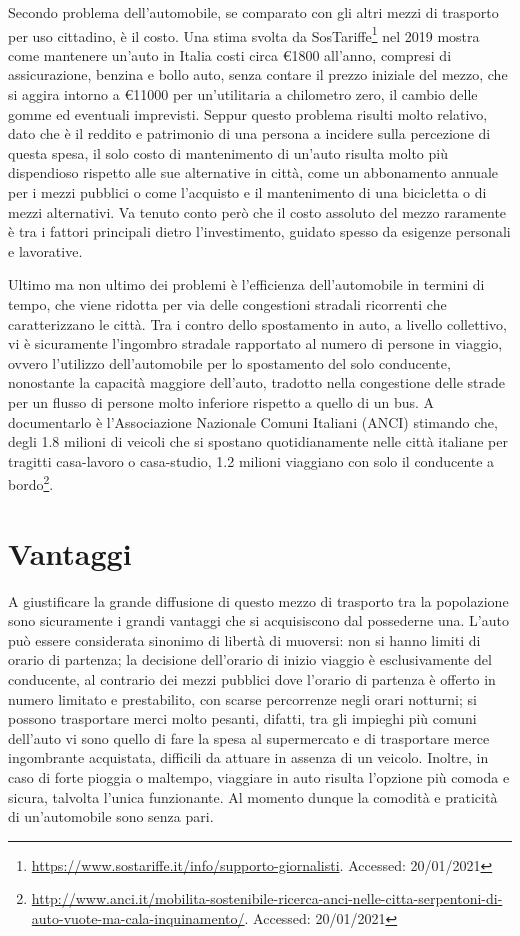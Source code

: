 Secondo problema dell'automobile, se comparato con gli altri mezzi di trasporto per uso cittadino, è il costo. Una stima svolta da SosTariffe\footnote{\url{https://www.sostariffe.it/info/supporto-giornalisti}. Accessed: 20/01/2021} nel 2019 mostra come mantenere un'auto in Italia costi circa €1800 all'anno, compresi di assicurazione, benzina e bollo auto, senza contare il prezzo iniziale del mezzo, che si aggira intorno a €11000 per un'utilitaria a chilometro zero, il cambio delle gomme ed eventuali imprevisti. Seppur questo problema risulti molto relativo, dato che è il reddito e patrimonio di una persona a incidere sulla percezione di questa spesa, il solo costo di mantenimento di un'auto risulta molto più dispendioso rispetto alle sue alternative in città, come un abbonamento annuale per i mezzi pubblici o come l'acquisto e il mantenimento di una bicicletta o di mezzi alternativi. Va tenuto conto però che il costo assoluto del mezzo raramente è tra i fattori principali dietro l'investimento, guidato spesso da esigenze personali e lavorative.

Ultimo ma non ultimo dei problemi è l'efficienza dell'automobile in termini di tempo, che viene ridotta per via delle congestioni stradali ricorrenti che caratterizzano le città. Tra i contro dello spostamento in auto, a livello collettivo, vi è sicuramente l'ingombro stradale rapportato al numero di persone in viaggio, ovvero l'utilizzo dell'automobile per lo spostamento del solo conducente, nonostante la capacità maggiore dell'auto, tradotto nella congestione delle strade per un flusso di persone molto inferiore rispetto a quello di un bus. A documentarlo è l'Associazione Nazionale Comuni Italiani (ANCI) stimando che, degli 1.8 milioni di veicoli che si spostano quotidianamente nelle città italiane per tragitti casa-lavoro o casa-studio, 1.2 milioni viaggiano con solo il conducente a bordo\footnote{\url{http://www.anci.it/mobilita-sostenibile-ricerca-anci-nelle-citta-serpentoni-di-auto-vuote-ma-cala-inquinamento/}. Accessed: 20/01/2021}.

\section{Vantaggi}

A giustificare la grande diffusione di questo mezzo di trasporto tra la popolazione sono sicuramente i grandi vantaggi che si acquisiscono dal possederne una. L'auto può essere considerata sinonimo di libertà di muoversi: non si hanno limiti di orario di partenza; la decisione dell'orario di inizio viaggio è esclusivamente del conducente, al contrario dei mezzi pubblici dove l'orario di partenza è offerto in numero limitato e prestabilito, con scarse percorrenze negli orari notturni; si possono trasportare merci molto pesanti, difatti, tra gli impieghi più comuni dell'auto vi sono quello di fare la spesa al supermercato e di trasportare merce ingombrante acquistata, difficili da attuare in assenza di un veicolo. Inoltre, in caso di forte pioggia o maltempo, viaggiare in auto risulta l'opzione più comoda e sicura, talvolta l'unica funzionante. Al momento dunque la comodità e praticità di un'automobile sono senza pari.

